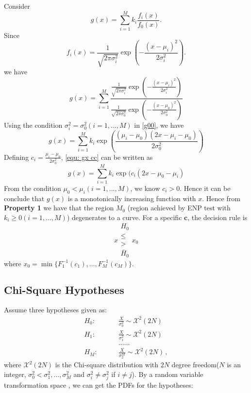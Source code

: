 \documentclass[12pt,journal,a4paper,twoside,onecolumn]{IEEEtran}
\begin{document}
\begin{spacing}{2.5}
Consider
\begin{equation}
\label{equ: define gx}
g(x) = \sum_{i=1}^{M}k_i\frac{f_i(x)}{f_0(x)}.
\end{equation}
Since 
\begin{equation}
\label{equ: gaussian PDF}
f_i(x) = \frac{1}{\sqrt{2\pi\sigma_i^2}}\exp(-\frac{(x-\mu_i)^2}{2\sigma_i^2}).
\end{equation}
we have
\begin{equation}
\label{g00}
g(x) = \sum_{i=1}^{M}\frac{\frac{1}{\sqrt{2\pi\sigma_i^2}}\exp(-\frac{(x-\mu_i)^2}{2\sigma_i^2})}{\frac{1}{\sqrt{2\pi\sigma_0^2}}\exp(-\frac{(x-\mu_0)^2}{2\sigma_0^2})}
\end{equation}
Using the condition $\sigma_i^2 = \sigma_0^2 (i = 1, ..., M)$ in \eqref{g00}, we have 
\begin{equation}
\label{equ: gx cc}
g(x) = \sum_{i=1}^{M}k_i\exp(\frac{(\mu_i - \mu_0)(2x-\mu_i - \mu_0)}{2\sigma_0^2})
\end{equation}
Defining $c_i = \frac{\mu_i - \mu_0}{2\sigma_0^2}$, \eqref{equ: gx cc} can be written as
\begin{equation}
g(x) = \sum_{i=1}^{M}k_i\exp(c_i(2x-\mu_0 - \mu_i)
\end{equation}
From the condition $\mu_0 < \mu_i (i=1, ..., M)$, we know $c_i >0$. Hence it can be conclude that $g(x)$ is a monotonically increasing function with $x$. Hence from \textbf{Property 1} we have that the region $M_0$ (region achieved by ENP test with $k_i \geq 0 (i=1, ..., M)$) degenerates to a curve.
For a specific $\mathbf{c}$, the decision rule is 
\[
x \substack{H_0 \\ \leq \\ > \\ \bar{H}_0} x_0
\]
where $x_0 = \min\{F_1^{-1}(c_1), ..., F_M^{-1}(c_M)\}$.

\subsection{Chi-Square Hypotheses}
Assume three hypotheses  given as:
\begin{equation}
  \label{equ: Chisquare Hypothesis}
  \begin{split}
    H_0:\;\;\;\;\;\;\;\;&\frac{X}{\sigma_0^2} \sim \mathcal{X}^2(2N)\\
    H_1:\;\;\;\;\;\;\;\;&\frac{X}{\sigma_1^2} \sim \mathcal{X}^2(2N)\\
    &......\\
    H_M:\;\;\;\;\;\;\;\;&\frac{X}{\sigma_2^M} \sim \mathcal{X}^2(2N)\,,
  \end{split}
\end{equation}
where $\mathcal{X}^2(2N)$ is the Chi-square distribution with  $2N$ degree freedom($N$ is an integer, $\sigma_0^2 < \sigma_1^2, ..., \sigma_M^2$ and $\sigma_i^2 \neq \sigma_j^2$ if $i \neq j$). By a random variable transformation space \cite{mark2011probability}, we can get the PDFs for the hypotheses:


\end{spacing}
\end{document}
